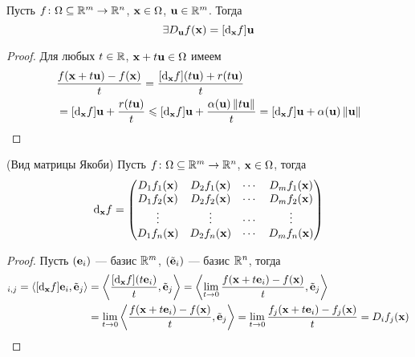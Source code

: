 \begin{proposition}
    Пусть $f \colon \O \subseteq \Rm \to \Rn$, $\x \in \O$, $\elemvec{u} \in
    \Rm$. Тогда
\[
    \exists \dder{f}{\x}{\elemvec{u}} = [\der{f}{\x}]\elemvec{u}
\]
\end{proposition}
\begin{proof} Для любых $t \in \R$, $\x + t\elemvec{u} \in \O$ имеем
\begin{align*}
    &\frac{f(\x + t\elemvec{u}) - f(\x)}{t} =
    \frac{[\der{f}{\x}](t\elemvec{u}) + r(t\elemvec{u})}{t} \\
    &= [\der{f}{\x}]\elemvec{u} +
    \frac{r(t\elemvec{u})}{t} \leqslant [\der{f}{\x}]\elemvec{u} +
    \frac{\a(\elemvec{u})\norm{t\elemvec{u}}}{t} =
    [\der{f}{\x}]\elemvec{u} + \a(\elemvec{u})\norm{\elemvec{u}}
\end{align*}
\end{proof}

\begin{theorem}(Вид матрицы Якоби)
    Пусть $f \colon \O \subseteq \Rm \to \Rn$, $\x \in \O$, тогда
\[
    \der{f}{\x} = \begin{pmatrix}
                    \dder{f_1}{\x}{1} & \dder{f_1}{\x}{2} & \cdots &
                    \dder{f_1}{\x}{m} \\
                    \dder{f_2}{\x}{1} & \dder{f_2}{\x}{2} & \cdots &
                    \dder{f_2}{\x}{m} \\
                    \vdots & \vdots & \cdots & \vdots \\
                    \dder{f_n}{\x}{1} & \dder{f_n}{\x}{2} & \cdots &
                    \dder{f_n}{\x}{m}
                  \end{pmatrix}
\]
\end{theorem}
\begin{proof}
    Пусть $(\elemvec{e}_i)$ --- базис $\Rm$, $(\tilde{\elemvec{e}}_i)$ --- базис
    $\Rn$, тогда
\begin{align*}
    [\der{f}{\x}]_{i, j} = \langle [\der{f}{\x}]\elemvec{e}_i,
    \tilde{\elemvec{e}}_j \rangle
    &= \left\langle \frac{[\der{f}{\x}](t\elemvec{e}_i)}{t},
    \tilde{\elemvec{e}}_j \right\rangle
    = \left\langle \lim_{t \to 0}{\frac{f(\x + t\elemvec{e}_i) - f(\x)}{t}},
    \tilde{\elemvec{e}}_j \right\rangle \\
    &= \lim_{t \to 0}{\left\langle \frac{f(\x + t\elemvec{e}_i) - f(\x)}{t},
    \tilde{\elemvec{e}}_j \right\rangle}
    = \lim_{t \to 0}{\frac{f_j(\x + t\elemvec{e}_i) - f_j(\x)}{t}}
    = \dder{f_j}{\x}{i}
\end{align*}
\end{proof}

